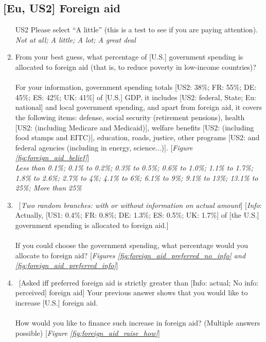 \subsection*{[Eu, US2] Foreign aid}
\begin{enumerate}[resume] 
    \item [US2] Please select ``A little'' (this is a test to see if you are paying attention).
    \\ \textit{Not at all; A little; A lot; A great deal}
    \item \label{q:foreign_aid_belief} From your best guess, what percentage of [U.S.] government spending is allocated to foreign aid (that is, to reduce poverty in low-income countries)?\\
 \\
    For your information, government spending totals [US2: 38\%; FR: 55\%; DE: 45\%; ES: 42\%; UK: 41\%] of [U.S.] GDP, it includes [US2: federal, State; Eu: national] and local government spending, and apart from foreign aid, it covers the following items: defense, social security (retirement pensions), health [US2: (including Medicare and Medicaid)], welfare benefits [US2: (including food stamps and EITC)], education, roads, justice, other programs [US2: and federal agencies (including in energy, science...)]. [\textit{Figure \ref{fig:foreign_aid_belief}}]
   \\ \textit{Less than 0.1\%; 0.1\% to 0.2\%; 0.3\% to 0.5\%; 0.6\% to 1.0\%; 1.1\% to 1.7\%; 1.8\% to 2.6\%; 2.7\% to 4\%; 4.1\% to 6\%; 6.1\% to 9\%; 9.1\% to 13\%; 13.1\% to 25\%; More than 25\%}
   \item \label{q:foreign_aid_preferred} ~[\textit{Two random branches: with or without information on actual amount}] [\textit{Info}: Actually, [US1: 0.4\%; FR: 0.8\%; DE: 1.3\%; ES: 0.5\%; UK: 1.7\%] of [the U.S.] government spending is allocated to foreign aid.]\\
 \\
   If you could choose the government spending, what percentage would you allocate to foreign aid? [\textit{Figures \ref{fig:foreign_aid_preferred_no_info} and \ref{fig:foreign_aid_preferred_info}}]
  \item \label{q:foreign_aid_raise_how} ~[Asked iff preferred foreign aid is strictly greater than [Info: actual; No info: perceived] foreign aid]  Your previous answer shows that you would like to increase [U.S.] foreign aid.\\
\\
  How would you like to finance such increase in foreign aid? (Multiple answers possible) [\textit{Figure \ref{fig:foreign_aid_raise_how}}]

\end{enumerate}
